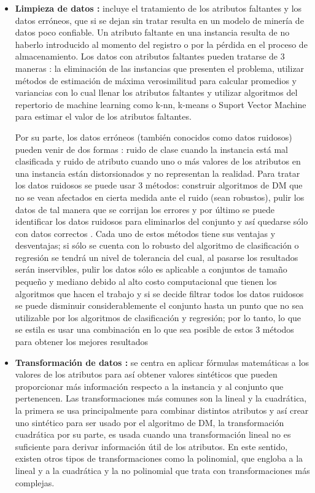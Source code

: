 \begin{itemize}
\item \textbf{Limpieza de datos \cite{garcia2016data, kim2003taxonomy}:}
incluye el tratamiento de los atributos faltantes y los datos erróneos, que si se dejan sin tratar resulta en un modelo de minería de datos poco confiable. Un atributo faltante en una instancia resulta de no haberlo introducido al momento del registro o por la pérdida en el proceso de almacenamiento. Los datos con atributos faltantes pueden tratarse de 3 maneras \cite{farhangfar2007novel}: la eliminación de las instancias que presenten el problema, utilizar métodos de estimación de máxima verosimilitud para calcular promedios y variancias con lo cual llenar los atributos faltantes y utilizar algoritmos del repertorio de machine learning como k-nn, k-means o Suport Vector Machine para estimar el valor de los atributos faltantes. 

Por su parte, los datos erróneos (también conocidos como datos ruidosos) pueden venir de dos formas \cite{catal2011class}: ruido de clase cuando la instancia está mal clasificada y ruido de atributo cuando uno o más valores de los atributos en una instancia están distorsionados y no representan la realidad. Para tratar los datos ruidosos se puede usar 3 métodos: construir algoritmos de DM que no se vean afectados en cierta medida ante el ruido (sean robustos), pulir los datos \cite{teng1999correcting} de tal manera que se corrijan los errores y por último se puede identificar los datos ruidosos para eliminarlos del conjunto y así quedarse sólo con datos correctos \cite{brodley1999identifying}. Cada uno de estos métodos tiene sus ventajas y desventajas; si sólo se cuenta con lo robusto del algoritmo de clasificación o regresión se tendrá un nivel de tolerancia del cual, al pasarse los resultados serán inservibles, pulir los datos sólo es aplicable a conjuntos de tamaño pequeño y mediano debido al alto costo computacional que tienen los algoritmos que hacen el trabajo y si se decide filtrar todos los datos ruidosos se puede disminuir considerablemente el conjunto hasta un punto que no sea utilizable por los algoritmos de clasificación y regresión; por lo tanto, lo que se estila es usar una combinación en lo que sea posible de estos 3 métodos para obtener los mejores resultados

\item \textbf{Transformación de datos \cite{garcia2016data}:}
se centra en aplicar fórmulas matemáticas a los valores de los atributos para así obtener valores sintéticos que pueden proporcionar más información respecto a la instancia y al conjunto que pertenencen. Las transformaciones más comunes son la lineal y la cuadrática, la primera se usa principalmente para combinar distintos atributos y así crear uno sintético para ser usado por el algoritmo de DM, la transformación cuadrática por su parte, es usada cuando una transformación lineal no es suficiente para derivar información útil de los atributos. En este sentido, existen otros tipos de transformaciones como la polinomial, que engloba a la lineal y a la cuadrática y la no polinomial que trata con transformaciones más complejas.


\end{itemize}
